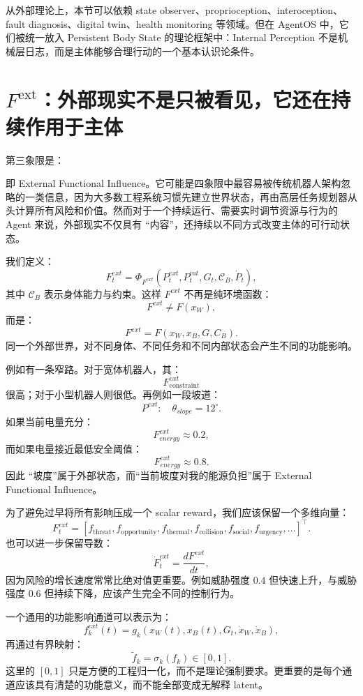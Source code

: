 从外部理论上，本节可以依赖 state observer、proprioception、interoception、fault diagnosis、digital twin、health monitoring 等领域。但在 AgentOS 中，它们被统一放入 Persistent Body State 的理论框架中：Internal Perception 不是机械层日志，而是主体能够合理行动的一个基本认识论条件。

\section{$F^{\mathrm{ext}}$：外部现实不是只被看见，它还在持续作用于主体}
\label{sec:external-functional-influence}

第三象限是：
\begin{statementbox}
\centering
{}
\end{statementbox}
即 External Functional Influence。它可能是四象限中最容易被传统机器人架构忽略的一类信息，因为大多数工程系统习惯先建立世界状态，再由高层任务规划器从头计算所有风险和价值。然而对于一个持续运行、需要实时调节资源与行为的 Agent 来说，外部现实不仅具有 ``内容''，还持续以不同方式改变主体的可行动状态。

我们定义：
\[
F_t^{ext}
=
\Phi_{F^{ext}}
(
P_t^{ext},
P_t^{int},
G_t,
\mathcal C_B,
\dot{P}_t
),
\]
其中 $\mathcal C_B$ 表示身体能力与约束。这样 $F^{ext}$ 不再是纯环境函数：
\[
F^{ext}\neq F(x_W),
\]
而是：
\[
\boxed{
F^{ext}=F(x_W,x_B,G,C_B).
}
\]
同一个外部世界，对不同身体、不同任务和不同内部状态会产生不同的功能影响。

例如有一条窄路。对于宽体机器人，其：
\[
F_{\mathrm{constraint}}^{ext}
\]
很高；对于小型机器人则很低。再例如一段坡道：
\[
P^{ext}:
\quad
\theta_{slope}=12^\circ.
\]
如果当前电量充分：
\[
F^{ext}_{energy}\approx0.2,
\]
而如果电量接近最低安全阈值：
\[
F^{ext}_{energy}\approx0.8.
\]
因此 ``坡度''属于外部状态，而``当前坡度对我的能源负担''属于 External Functional Influence。

为了避免过早将所有影响压成一个 scalar reward，我们应该保留一个多维向量：
\[
F_t^{ext}
=
[
f_{\mathrm{threat}},
f_{\mathrm{opportunity}},
f_{\mathrm{thermal}},
f_{\mathrm{collision}},
f_{\mathrm{social}},
f_{\mathrm{urgency}},
\ldots
]^\top.
\]
也可以进一步保留导数：
\[
\dot{F}_t^{ext}
=
\frac{dF^{ext}}{dt},
\]
因为风险的增长速度常常比绝对值更重要。例如威胁强度 $0.4$ 但快速上升，与威胁强度 $0.6$ 但持续下降，应该产生完全不同的控制行为。

一个通用的功能影响通道可以表示为：
\[
f_k^{ext}(t)
=
g_k(
x_W(t),
x_B(t),
G_t,
\dot{x}_W,
\dot{x}_B
),
\]
再通过有界映射：
\[
\tilde f_k
=
\sigma_k(f_k)
\in[0,1].
\]
这里的 $[0,1]$ 只是方便的工程归一化，而不是理论强制要求。更重要的是每个通道应该具有清楚的功能意义，而不能全部变成无解释 latent。


